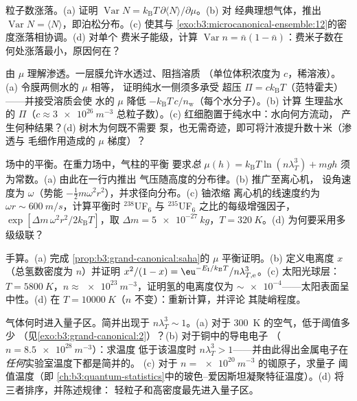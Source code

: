 \begin{exercise}[$\star\star$]\label{exo:b3:grand-canonical:7}
粒子数涨落。(a) 证明 $\operatorname{Var}N =
k_{\text{B}}T\,\partial\langle N\rangle/\partial\mu$。(b) 对
经典理想气体，推出 $\operatorname{Var}N = \langle
N\rangle$，即泊松分布。(c) 使其与
\cref{exo:b3:microcanonical-ensemble:12}的密度涨落相协调。(d) 对单个
费米子能级，计算 $\operatorname{Var}n = \bar n(1 - \bar
n)$：费米子数在何处涨落最小，原因何在？
\end{exercise}

\begin{exercise}[$\star\star$]\label{exo:b3:grand-canonical:8}
由 $\mu$ 理解渗透。一层膜允许水透过、阻挡溶质
（单位体积浓度为 $c$，稀溶液）。(a) 令膜两侧水的 $\mu$ 相等，
证明纯水一侧须多承受
超压 $\Pi = ck_{\text{B}}T$（范特霍夫）——并接受溶质会使
水的 $\mu$ 降低
$-k_{\text{B}}T\,c/n_{\text{w}}$（每个水分子）。(b) 计算
生理盐水的 $\Pi$（$c \approx \qty{3e26}{m^{-3}}$
总粒子数）。(c) 红细胞置于纯水中：水向何方流动，
产生何种结果？(d) 树木为何既不需要
泵，也无需奇迹，即可将汁液提升数十米（渗透与
毛细作用造成的 $\mu$ 梯度）？
\end{exercise}

\begin{exercise}[$\star\star$]\label{exo:b3:grand-canonical:9}
场中的平衡。在重力场中，气柱的平衡
要求\emph{总} $\mu(h) =
k_{\text{B}}T\ln(n\lambda_T^3) + mgh$ 须为常数。(a) 由此在一行内推出
气压随高度的分布律。(b) 推广至离心机，
设角速度为 $\omega$（势能
$-\tfrac12 m\omega^2r^2$），并求径向分布。(c) 铀浓缩
离心机的线速度约为 $\omega r \sim
\qty{600}{m/s}$，计算平衡时 $^{238}$UF$_6$
与 $^{235}$UF$_6$ 之比的每级增强因子，$\exp[\Delta m\,\omega^2
r^2/2k_{\text{B}}T]$，取 $\Delta m = \qty{5e-27}{kg}$，$T =
\qty{320}{K}$。(d) 为何要采用多级级联？
\end{exercise}

\begin{exercise}[$\star\star\star$]\label{exo:b3:grand-canonical:10}
手算。(a) 完成
\cref{prop:b3:grand-canonical:saha}的 $\mu$ 平衡证明。(b) 定义电离度 $x$
（总氢数密度为 $n$）并证明 $x^2/(1 - x)
= \eu^{-E_{\text{I}}/k_{\text{B}}T}/n\lambda_{T,\text{e}}^3$。(c)
太阳光球层：$T = \qty{5800}{K}$，$n \approx
\qty{e23}{m^{-3}}$，证明氢的电离度仅为
$\sim\num{e-4}$——太阳表面呈中性。(d) 在 $T =
\qty{10000}{K}$（$n$ 不变）：重新计算，并评论
其陡峭程度。
\end{exercise}

\begin{exercise}[$\star\star\star$]\label{exo:b3:grand-canonical:11}
气体何时进入量子区。简并出现于 $n\lambda_T^3 \sim
1$。(a) 对于 \qty{300}{K} 的空气，低于阈值多少
（见\cref{exo:b3:grand-canonical:2}）？(b) 对于铜中的导电电子
（$n = \qty{8.5e28}{m^{-3}}$）：求温度
低于该温度时 $n\lambda_T^3 > 1$——并由此得出金属电子在
\emph{任何}实验室温度下都是简并的。
(c) 对于 $n = \qty{e20}{m^{-3}}$ 的铷原子，求量子
阈值温度（即
\cref{ch:b3:quantum-statistics}中的玻色–爱因斯坦凝聚特征温度）。(d) 将三者排序，并陈述规律：
轻粒子和高密度最先进入量子区。
\end{exercise}

